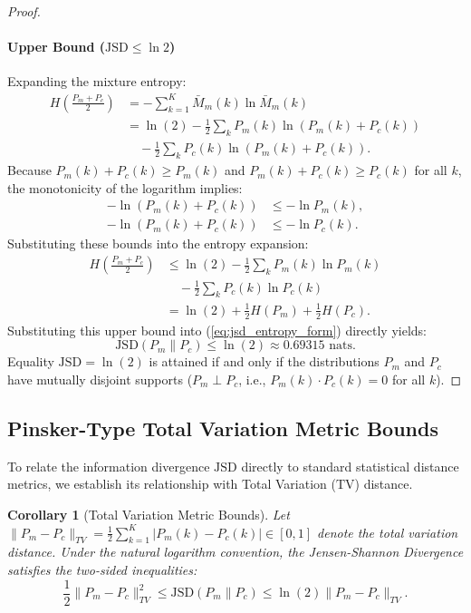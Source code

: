 \documentclass[conference]{IEEEtran}
\newtheorem{corollary}{Corollary}
\begin{document}
\begin{proof}
\paragraph{Upper Bound ($\mathrm{JSD} \le \ln 2$)} Expanding the mixture entropy:
\begin{align}
H\left( \frac{P_m + P_c}{2} \right) &= -\sum_{k=1}^K \bar{M}_m(k) \ln \bar{M}_m(k) \nonumber \\
&= \ln(2) - \frac{1}{2}\sum_k P_m(k) \ln(P_m(k) + P_c(k)) \nonumber \\
&\quad - \frac{1}{2}\sum_k P_c(k) \ln(P_m(k) + P_c(k)).
\end{align}
Because $P_m(k) + P_c(k) \ge P_m(k)$ and $P_m(k) + P_c(k) \ge P_c(k)$ for all $k$, the monotonicity of the logarithm implies:
\begin{align}
-\ln(P_m(k) + P_c(k)) &\le -\ln P_m(k), \\
-\ln(P_m(k) + P_c(k)) &\le -\ln P_c(k).
\end{align}
Substituting these bounds into the entropy expansion:
\begin{align}
H\left( \frac{P_m + P_c}{2} \right) &\le \ln(2) - \frac{1}{2}\sum_k P_m(k) \ln P_m(k) \nonumber \\
&\quad - \frac{1}{2}\sum_k P_c(k) \ln P_c(k) \nonumber \\
&= \ln(2) + \frac{1}{2} H(P_m) + \frac{1}{2} H(P_c).
\end{align}
Substituting this upper bound into (\ref{eq:jsd_entropy_form}) directly yields:
\begin{equation}
\mathrm{JSD}(P_m \parallel P_c) \le \ln(2) \approx 0.69315\text{ nats}.
\end{equation}
Equality $\mathrm{JSD} = \ln(2)$ is attained if and only if the distributions $P_m$ and $P_c$ have mutually disjoint supports ($P_m \perp P_c$, i.e., $P_m(k) \cdot P_c(k) = 0$ for all $k$).
\end{proof}

\subsection{Pinsker-Type Total Variation Metric Bounds}
To relate the information divergence $\mathrm{JSD}$ directly to standard statistical distance metrics, we establish its relationship with Total Variation ($\mathrm{TV}$) distance.

\begin{corollary}[Total Variation Metric Bounds]
\label{cor:tv_bounds}
Let $\|P_m - P_c\|_{TV} = \frac{1}{2}\sum_{k=1}^K |P_m(k) - P_c(k)| \in [0, 1]$ denote the total variation distance. Under the natural logarithm convention, the Jensen-Shannon Divergence satisfies the two-sided inequalities:
\begin{equation}
\frac{1}{2} \|P_m - P_c\|_{TV}^2 \le \mathrm{JSD}(P_m \parallel P_c) \le \ln(2) \|P_m - P_c\|_{TV}.
\end{equation}
\end{corollary}
\end{document}
